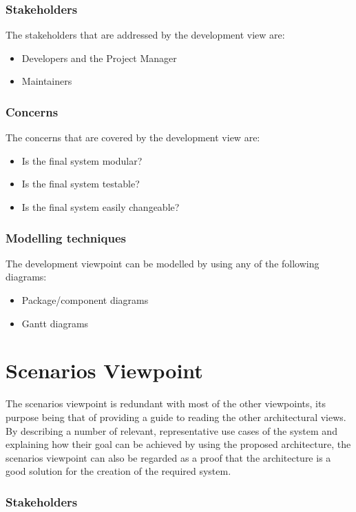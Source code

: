 \subsubsection{Stakeholders}
The stakeholders that are addressed by the development view are:
\begin{itemize}
\item Developers and the Project Manager
\item Maintainers
\end{itemize}

\subsubsection{Concerns}
The concerns that are covered by the development view are:
\begin{itemize}
\item Is the final system modular? %
\item Is the final system testable? %
\item Is the final system easily changeable? %
\end{itemize}

\subsubsection{Modelling techniques}
The development viewpoint can be modelled by using any of the following diagrams:
\begin{itemize}
\item Package/component diagrams
\item Gantt diagrams
\end{itemize}

\section{Scenarios Viewpoint}

The scenarios viewpoint is redundant with most of the other viewpoints, its purpose being
that of providing a guide to reading the other architectural views. By describing a number
of relevant, representative use cases of the system and explaining how their goal can be
achieved by using the proposed architecture, the scenarios viewpoint can also be regarded
as a proof that the architecture is a good solution for the creation of the required system.

\subsubsection{Stakeholders}


